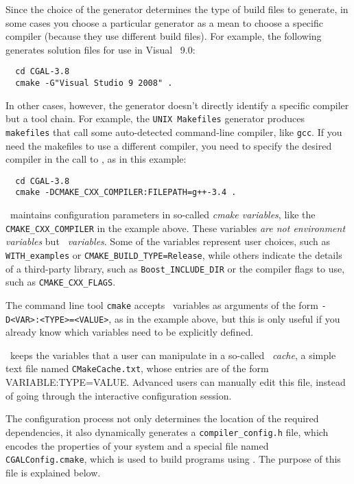Since the choice of the generator determines the type of build files to generate, in some cases
you choose a particular generator as a mean to choose a specific compiler (because they use different 
build files). For example, the following generates solution files for use in Visual \CC\ 9.0:

{\ccTexHtml{\scriptsize}{}
\begin{verbatim}
  cd CGAL-3.8
  cmake -G"Visual Studio 9 2008" . 
\end{verbatim}
}

In other cases, however, the generator doesn't directly identify a specific compiler but a tool chain.
For example, the \texttt{UNIX Makefiles} generator produces \texttt{makefiles} that call some auto-detected
command-line compiler, like \texttt{gcc}. If you need the makefiles to use a different compiler, you need to
specify the desired compiler in the call to \cmake{}, as in this example:

{\ccTexHtml{\scriptsize}{}
\begin{verbatim}
  cd CGAL-3.8
  cmake -DCMAKE_CXX_COMPILER:FILEPATH=g++-3.4 . 
\end{verbatim}
}


\cmake\ maintains configuration parameters in so-called {\em cmake variables}, like the \texttt{CMAKE\_CXX\_COMPILER}
in the example above. These variables {\em are not environment variables} but {\em \cmake\ variables}. Some of the \cmake{} 
variables represent user choices, such as \texttt{WITH\_examples} or \texttt{CMAKE\_BUILD\_TYPE=Release}, while others
indicate the details of a third-party library, such as \texttt{Boost\_INCLUDE\_DIR} or the compiler flags to use,
such as \texttt{CMAKE\_CXX\_FLAGS}. 

The command line tool \texttt{cmake} accepts \cmake\ variables as arguments of the form \texttt{-D<VAR>:<TYPE>=<VALUE>}, as
in the example above, but this is only useful if you already know which variables need to be explicitly defined.

\begin{ccAdvanced}
\cmake\ keeps the variables that a user can manipulate in a so-called {\em \cmake\ cache}, a simple text file 
named \texttt{CMakeCache.txt}, whose entries are of the form VARIABLE:TYPE=VALUE. Advanced users can manually edit this 
file, instead of going through the interactive configuration session.
\end{ccAdvanced}


The configuration process not only determines the location of the required dependencies, it also dynamically generates a
\texttt{compiler\_config.h} file, which encodes the properties of your system and a special file named 
\texttt{CGALConfig.cmake}, which is used to build programs using \cgal. The
purpose of this file is explained below.

